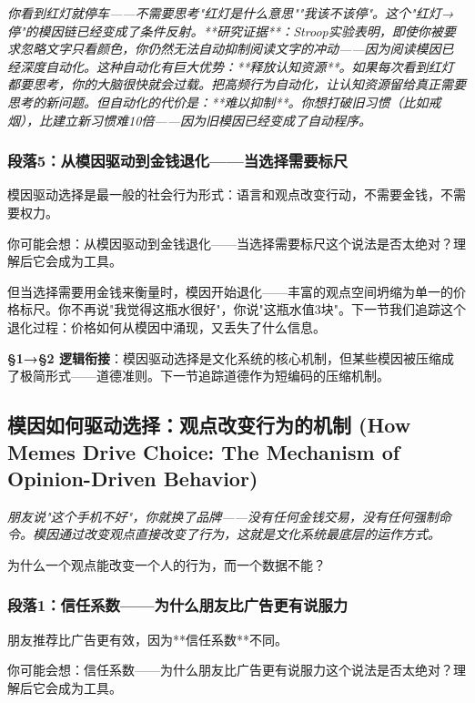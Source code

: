 \documentclass[a4paper,12pt]{book}
\newenvironment{motivation}{\begin{tcolorbox}[colback=gray!10,colframe=gray!60,title=\textit{动机}]\small\itshape}{\end{tcolorbox}}
\newenvironment{questionbox}{\begin{tcolorbox}[colback=red!3,colframe=red!60]}{\end{tcolorbox}}
\begin{document}
\begin{motivation}
\begin{motivation}
\begin{motivation}
你看到红灯就停车——不需要思考"红灯是什么意思""我该不该停"。这个"红灯→停"的模因链已经变成了条件反射。**研究证据**：Stroop实验表明，即使你被要求忽略文字只看颜色，你仍然无法自动抑制阅读文字的冲动——因为阅读模因已经深度自动化。这种自动化有巨大优势：**释放认知资源**。如果每次看到红灯都要思考，你的大脑很快就会过载。把高频行为自动化，让认知资源留给真正需要思考的新问题。但自动化的代价是：**难以抑制**。你想打破旧习惯（比如戒烟），比建立新习惯难10倍——因为旧模因已经变成了自动程序。

	\subsubsection*{段落5：从模因驱动到金钱退化——当选择需要标尺}
	模因驱动选择是最一般的社会行为形式：语言和观点改变行动，不需要金钱，不需要权力。
	\begin{tcolorbox}[colback=yellow!5, title=\textit{读者行为预测}]
		你可能会想：从模因驱动到金钱退化——当选择需要标尺这个说法是否太绝对？理解后它会成为工具。
	\end{tcolorbox}

但当选择需要用金钱来衡量时，模因开始退化——丰富的观点空间坍缩为单一的价格标尺。你不再说"我觉得这瓶水很好"，你说"这瓶水值3块"。下一节我们追踪这个退化过程：价格如何从模因中涌现，又丢失了什么信息。

	\textbf{§1→§2 逻辑衔接}：模因驱动选择是文化系统的核心机制，但某些模因被压缩成了极简形式——道德准则。下一节追踪道德作为短编码的压缩机制。

\subsection{模因如何驱动选择：观点改变行为的机制 (How Memes Drive Choice: The Mechanism of Opinion-Driven Behavior)}
\begin{motivation}
	朋友说"这个手机不好"，你就换了品牌——没有任何金钱交易，没有任何强制命令。模因通过改变观点直接改变了行为，这就是文化系统最底层的运作方式。
\end{motivation}
\begin{questionbox}
	为什么一个观点能改变一个人的行为，而一个数据不能？
\end{questionbox}

	\subsubsection*{段落1：信任系数——为什么朋友比广告更有说服力}
朋友推荐比广告更有效，因为**信任系数**不同。
	\begin{tcolorbox}[colback=yellow!5, title=\textit{读者行为预测}]
		你可能会想：信任系数——为什么朋友比广告更有说服力这个说法是否太绝对？理解后它会成为工具。
	\end{tcolorbox}


\end{motivation}
\end{motivation}
\end{motivation}
\end{document}
